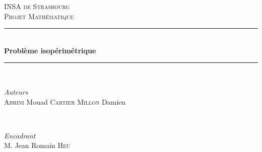 \documentclass[12pt]{report}
\begin{document}

\begin{titlepage} %
	\newcommand{\HRule}{\rule{\linewidth}{0.5mm}} %
	
	\center %
	
	
	\textsc{\LARGE INSA de Strasbourg}\\[1.2cm] %
	
	\textsc{\Large Projet Mathématique}\\[0.5cm] %
	
	
	
	\HRule\\[0.4cm]
	
	{\huge\bfseries Problème isopérimétrique}\\[0.4cm] %
	
	\HRule\\[1.5cm]
	
	
	\begin{minipage}{0.4\textwidth}
		\begin{flushleft}
			\large
			\textit{Auteurs}\\
			\textsc{Abrini} Mouad %
			\textsc{Cartier Millon} Damien %
		\end{flushleft}
	\end{minipage}
	~
	\begin{minipage}{0.4\textwidth}
		\begin{flushright}
			\large
			\textit{Encadrant}\\
			M. Jean Romain \textsc{Heu} %
		\end{flushright}
	\end{minipage}
	

\end{titlepage}
\end{document}
